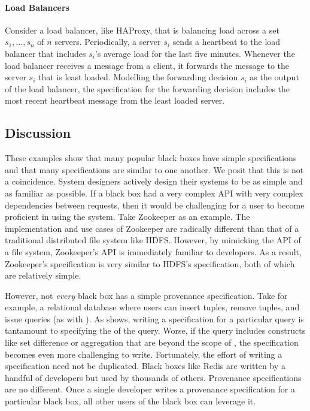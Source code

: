 \paragraph{Load Balancers}
Consider a load balancer, like HAProxy, that is balancing load across a set
$s_1, \ldots, s_n$ of $n$ servers. Periodically, a server $s_i$ sends a
heartbeat to the load balancer that includes $s_i$'s average load for the last
five minutes. Whenever the load balancer receives a message from a client, it
forwards the message to the server $s_i$ that is least loaded. Modelling the
forwarding decision $s_i$ as the output of the load balancer, the
\watprovenance{} specification for the forwarding decision includes the most
recent heartbeat message from the least loaded server.

\subsection{Discussion}
These examples show that many popular black boxes have simple \watprovenance{}
specifications and that many \watprovenance{} specifications are similar to one
another. We posit that this is not a coincidence. System designers actively
design their systems to be as simple and as familiar as possible. If a black
box had a very complex API with very complex dependencies between requests,
then it would be challenging for a user to become proficient in using the
system. Take Zookeeper as an example. The implementation and use cases of
Zookeeper are radically different than that of a traditional distributed file
system like HDFS. However, by mimicking the API of a file system, Zookeeper's
API is immediately familiar to developers. As a result, Zookeeper's
\watprovenance{} specification is very similar to HDFS's \watprovenance{}
specification, both of which are relatively simple.

However, not \emph{every} black box has a simple provenance specification. Take
for example, a relational database where users can insert tuples, remove
tuples, and issue queries (as with ). As
 shows, writing a \watprovenance{} specification for a
particular query is tantamount to specifying the \whyprovenance{} of the query.
Worse, if the query includes constructs like set difference or aggregation that
are beyond the scope of \whyprovenance{}, the \watprovenance{} specification
becomes even more challenging to write. Fortunately, the effort of writing a
\watprovenance{} specification need not be duplicated. Black boxes like Redis
are written by a handful of developers but used by thousands of others.
Provenance specifications are no different. Once a single developer writes a
provenance specification for a particular black box, all other users of the
black box can leverage it.

